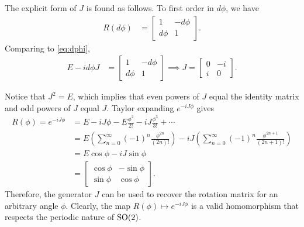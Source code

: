     The explicit form of $J$ is found as follows. To first order in $d\phi$, we have
    \begin{align*}
        R(d\phi) &= \begin{bmatrix}
            1 & -d\phi \\
            d\phi & 1
        \end{bmatrix}.
    \end{align*}
    Comparing to \cref{eq:dphi},
    \begin{align*}
        E - i d\phi J &= \begin{bmatrix}
            1 & -d\phi \\
            d\phi & 1
        \end{bmatrix} \implies J = \begin{bmatrix}
            0 & -i \\
            i & 0
        \end{bmatrix}.
    \end{align*}
    
    Notice that $J^2 = E$, which implies that even powers of $J$ equal the identity matrix and odd powers of $J$ equal $J$. Taylor expanding $e^{-iJ\phi }$ gives
    \begin{align*}
        R(\phi) = e^{-iJ\phi} &= E - iJ\phi - E \frac{\phi^2}{2!} - iJ\frac{\phi^3}{3!} + \cdots \\
        &= E\left( \sum_{n=0}^{\infty} {(-1)}^n \frac{\phi^{2n}}{(2n)!} \right) - iJ\left( \sum_{n=0}^{\infty} {(-1)}^n \frac{\phi^{2n+1}}{(2n+1)!} \right) \\
        &= E\cos\phi - iJ\sin\phi \\
        &= \begin{bmatrix}
            \cos\phi & -\sin\phi \\
            \sin\phi & \cos\phi
        \end{bmatrix}.
    \end{align*}
    Therefore, the generator $J$ can be used to recover the rotation matrix for an arbitrary angle $\phi$. Clearly, the map $R(\phi)\mapsto e^{-iJ\phi}$ is a valid homomorphism that respects the periodic nature of $\textrm{SO}{(2)}$.

